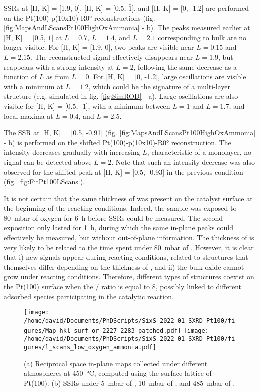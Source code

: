 SSRs at [H, K] = [1.9, 0], [H, K] = [0.5,  $\bar{1}$], and [H, K] = [0, -1.2] are performed on the Pt(100)-p(10x10)-R\ang{0} reconstructions (fig. \ref{fig:MapsAndLScansPt100HighOxAmmonia} - b).
The peaks measured earlier at [H, K] = [0.5, $\bar{1}$] at $L=0.7$, $L=1.4$, and $L=2.1$ corresponding to bulk  are no longer visible.
For [H, K] = [1.9, 0], two peaks are visible near $L=0.15$ and $L=2.15$.
The reconstructed signal effectively disappears near $L=1.9$, but reappears with a strong intensity at $L=2$, following the same decrease as a function of $L$ as from $L=0$.
For [H, K] = [0, -1.2], large oscillations are visible with a minimum at $L=1.2$, which could be the signature of a multi-layer structure (e.g. simulated  in fig. \ref{fig:SimROD} - a).
Large oscillations are also visible for [H, K] = [0.5, -1], with a minimum between $L=1$ and $L=1.7$, and local maxima at $L=0.4$, and $L=2.5$.

The SSR at [H, K] = [0.5, -0.91] (fig. \ref{fig:MapsAndLScansPt100HighOxAmmonia} - b) is performed on the shifted Pt(100)-p(10x10)-R\ang{0} reconstruction.
The intensity decreases gradually with increasing $L$, characteristic of a monolayer, no signal can be detected above $L=2$.
Note that such an intensity decrease was also observed for the shifted peak at [H, K] = [0.5, -0.93] in the previous condition (fig. \ref{fig:FitPt100LScans}).

It is not certain that the same thickness of  was present on the catalyst surface at the beginning of the reacting conditions.
Indeed, the sample was exposed to \qty{80}{\milli\bar} of oxygen for \qty{6}{\hour} before SSRs could be measured.
The second exposition only lasted for \qty{1}{\hour}, during which the same in-plane peaks could effectively be measured, but without out-of-plane information.
The thickness of  is very likely to be related to the time spent under \qty{80}{\milli\bar} of .
However, it is clear that i) new signals appear during reacting conditions, related to structures that themselves differ depending on the thickness of , and ii) the bulk oxide cannot grow under reacting conditions.
Therefore, different types of structures coexist on the Pt(100) surface when the / ratio is equal to \num{8}, possibly linked to different adsorbed species participating in the catalytic reaction.

\begin{figure}[!htb]
    \centering
    \texttt{[image: /home/david/Documents/PhDScripts/SixS\_2022\_01\_SXRD\_Pt100/figures/Map\_hkl\_surf\_or\_2227-2283\_patched.pdf]}
    \texttt{[image: /home/david/Documents/PhDScripts/SixS\_2022\_01\_SXRD\_Pt100/figures/l\_scans\_low\_oxygen\_ammonia.pdf]}
    \caption{
        (a) Reciprocal space in-plane maps collected under different atmospheres at \qty{450}{\degreeCelsius}, computed using the surface lattice of Pt(100).
        (b) SSRs under \qty{5}{\milli\bar} of , \qty{10}{\milli\bar} of , and \qty{485}{\milli\bar} of .
    }
    \label{fig:MapsAndLScansPt100LowOxAmmonia}
\end{figure}

